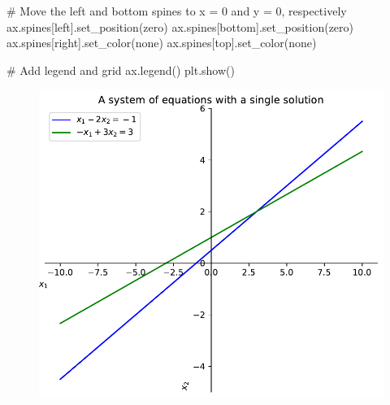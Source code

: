 \documentclass[
  letterpaper,
  DIV=11,
  numbers=noendperiod]{scrreprt}
\newenvironment{Shaded}{\begin{snugshade}}{\end{snugshade}}
\newcommand{\CommentTok}[1]{\textcolor[rgb]{0.37,0.37,0.37}{#1}}
\newcommand{\NormalTok}[1]{\textcolor[rgb]{0.00,0.23,0.31}{#1}}
\newcommand{\StringTok}[1]{\textcolor[rgb]{0.13,0.47,0.30}{#1}}
\begin{document}
\begin{Shaded}
\begin{Highlighting}[]
\CommentTok{\# Move the left and bottom spines to x = 0 and y = 0, respectively}
\NormalTok{ax.spines[}\StringTok{\textquotesingle{}left\textquotesingle{}}\NormalTok{].set\_position(}\StringTok{\textquotesingle{}zero\textquotesingle{}}\NormalTok{)}
\NormalTok{ax.spines[}\StringTok{\textquotesingle{}bottom\textquotesingle{}}\NormalTok{].set\_position(}\StringTok{\textquotesingle{}zero\textquotesingle{}}\NormalTok{)}
\NormalTok{ax.spines[}\StringTok{\textquotesingle{}right\textquotesingle{}}\NormalTok{].set\_color(}\StringTok{\textquotesingle{}none\textquotesingle{}}\NormalTok{)}
\NormalTok{ax.spines[}\StringTok{\textquotesingle{}top\textquotesingle{}}\NormalTok{].set\_color(}\StringTok{\textquotesingle{}none\textquotesingle{}}\NormalTok{)}

\CommentTok{\# Add legend and grid}
\NormalTok{ax.legend()}
\NormalTok{plt.show()}
\end{Highlighting}
\end{Shaded}

\begin{figure}[H]

{\centering \includegraphics{p1_files/figure-pdf/cell-3-output-1.pdf}

}

\end{figure}
\end{document}
